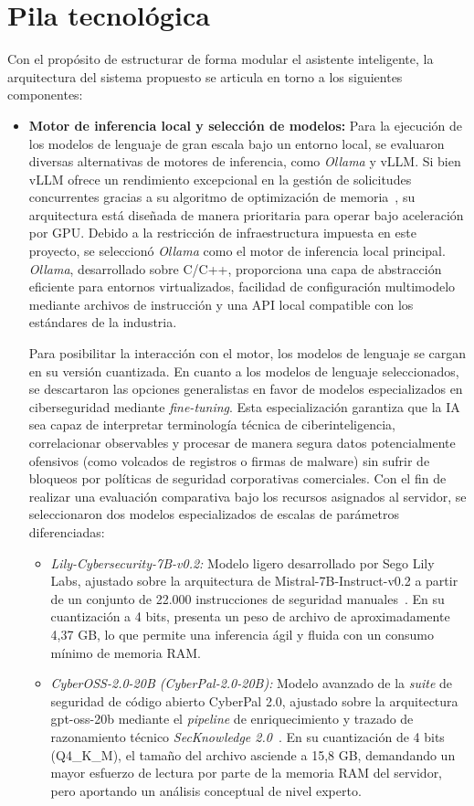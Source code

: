 \documentclass[12pt]{report}
\begin{document}
\section{Pila tecnológica}
Con el propósito de estructurar de forma modular el asistente inteligente, la arquitectura del sistema propuesto se articula en torno a los siguientes componentes:
\begin{itemize}
    \item \textbf{Motor de inferencia local y selección de modelos:} Para la ejecución de los modelos de lenguaje de gran escala bajo un entorno local, se evaluaron diversas alternativas de motores de inferencia, como \textit{Ollama} y vLLM. Si bien vLLM ofrece un rendimiento excepcional en la gestión de solicitudes concurrentes gracias a su algoritmo de optimización de memoria~\cite{kwon2023paged}, su arquitectura está diseñada de manera prioritaria para operar bajo aceleración por GPU. Debido a la restricción de infraestructura impuesta en este proyecto, se seleccionó \textit{Ollama} como el motor de inferencia local principal. \textit{Ollama}, desarrollado sobre C/C++, proporciona una capa de abstracción eficiente para entornos virtualizados, facilidad de configuración multimodelo mediante archivos de instrucción y una API local compatible con los estándares de la industria.

    Para posibilitar la interacción con el motor, los modelos de lenguaje se cargan en su versión cuantizada. En cuanto a los modelos de lenguaje seleccionados, se descartaron las opciones generalistas en favor de modelos especializados en ciberseguridad mediante \textit{fine-tuning}. Esta especialización garantiza que la IA sea capaz de interpretar terminología técnica de ciberinteligencia, correlacionar observables y procesar de manera segura datos potencialmente ofensivos (como volcados de registros o firmas de malware) sin sufrir de bloqueos por políticas de seguridad corporativas comerciales. Con el fin de realizar una evaluación comparativa bajo los recursos asignados al servidor, se seleccionaron dos modelos especializados de escalas de parámetros diferenciadas:
    \begin{itemize}
        \item \textit{Lily-Cybersecurity-7B-v0.2:} Modelo ligero desarrollado por Sego Lily Labs, ajustado sobre la arquitectura de Mistral-7B-Instruct-v0.2 a partir de un conjunto de 22.000 instrucciones de seguridad manuales~\cite{segolily2024lily}. En su cuantización a 4 bits, presenta un peso de archivo de aproximadamente 4,37 GB, lo que permite una inferencia ágil y fluida con un consumo mínimo de memoria RAM.
        \item \textit{CyberOSS-2.0-20B (CyberPal-2.0-20B):} Modelo avanzado de la \textit{suite} de seguridad de código abierto CyberPal 2.0, ajustado sobre la arquitectura gpt-oss-20b mediante el \textit{pipeline} de enriquecimiento y trazado de razonamiento técnico \textit{SecKnowledge 2.0}~\cite{levi2025toward}. En su cuantización de 4 bits (Q4\_K\_M), el tamaño del archivo asciende a 15,8 GB, demandando un mayor esfuerzo de lectura por parte de la memoria RAM del servidor, pero aportando un análisis conceptual de nivel experto.
    \end{itemize}


\end{itemize}
\end{document}
